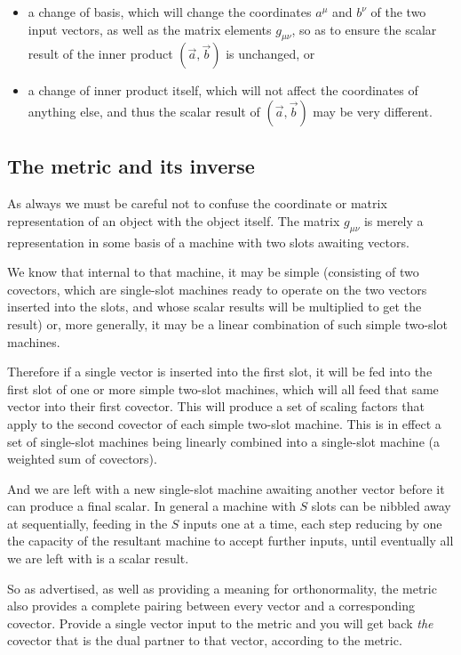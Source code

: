 \begin{itemize}
    \item a change of basis, which will change the coordinates $a^{\mu}$ and $b^{\nu}$ of the two input vectors, as well as the matrix elements $g_{\mu\nu}$, so as to ensure the scalar result of the inner product $(\vec{a}, \vec{b})$ is unchanged, or
    \item a change of inner product itself, which will not affect the coordinates of anything else, and thus the scalar result of $(\vec{a}, \vec{b})$ may be very different.
\end{itemize}

\subsection{The metric and its inverse}

As always we must be careful not to confuse the coordinate or matrix representation of an object with the object itself. The matrix $g_{\mu\nu}$ is merely a representation in some basis of a machine with two slots awaiting vectors. 

We know that internal to that machine, it may be simple (consisting of two covectors, which are single-slot machines ready to operate on the two vectors inserted into the slots, and whose scalar results will be multiplied to get the result) or, more generally, it may be a linear combination of such simple two-slot machines.

Therefore if a single vector is inserted into the first slot, it will be fed into the first slot of one or more simple two-slot machines, which will all feed that same vector into their first covector. This will produce a set of scaling factors that apply to the second covector of each simple two-slot machine. This is in effect a set of single-slot machines being linearly combined into a single-slot machine (a weighted sum of covectors).

And we are left with a new single-slot machine awaiting another vector before it can produce a final scalar. In general a machine with $S$ slots can be nibbled away at sequentially, feeding in the $S$ inputs one at a time, each step reducing by one the capacity of the resultant machine to accept further inputs, until eventually all we are left with is a scalar result.

So as advertised, as well as providing a meaning for orthonormality, the metric also provides a complete pairing between every vector and a corresponding covector. Provide a single vector input to the metric and you will get back \textit{the} covector that is the dual partner to that vector, according to the metric.

